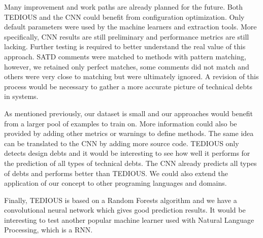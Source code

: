 Many improvement and work paths are already planned for the future. Both TEDIOUS and the CNN could benefit from configuration optimization. Only default parameters were used by the machine learners and extraction tools. More specifically, CNN results are still preliminary and performance metrics are still lacking. Further testing is required to better understand the real value of this approach. SATD comments were matched to methods with pattern matching, however, we retained only perfect matches, some comments did not match and others were very close to matching but were ultimately ignored. A revision of this process would be necessary to gather a more accurate picture of technical debts in systems.

As mentioned previously, our dataset is small and our approaches would benefit from a larger pool of examples to train on. More information could also be provided by adding other metrics or warnings to define methods. The same idea can be translated to the CNN by adding more source code. TEDIOUS only detects design debts and it would be interesting to see how well it performs for the prediction of all types of technical debts. The CNN already predicts all types of debts and performs better than TEDIOUS. We could also extend the application of our concept to other programing languages and domains. 

Finally, TEDIOUS is based on a Random Forests algorithm and we have a convolutional neural network which gives good prediction results. It would be interesting to test another popular machine learner used with Natural Language Processing, which is a \ac{RNN}.





















